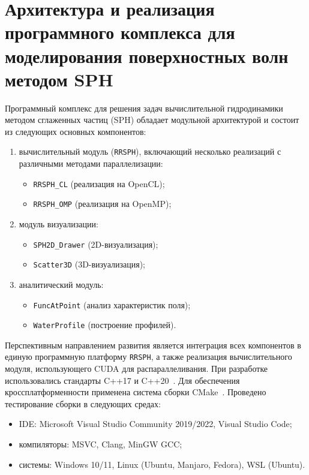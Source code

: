 \chapter{Архитектура и реализация программного комплекса для моделирования поверхностных волн методом SPH}

Программный комплекс для решения задач вычислительной гидродинамики методом сглаженных частиц (SPH) 
обладает модульной архитектурой и состоит из следующих основных компонентов:
%
\begin{enumerate}
    \item вычислительный модуль (\verb|RRSPH|), включающий несколько реализаций с различными методами параллелизации:
        \begin{itemize}
            \item \verb|RRSPH_CL| (реализация на OpenCL);
            \item \verb|RRSPH_OMP| (реализация на OpenMP);
        \end{itemize}
    \item модуль визуализации:
        \begin{itemize}
            \item \verb|SPH2D_Drawer| (2D-визуализация);
            \item \verb|Scatter3D| (3D-визуализация);
        \end{itemize}
    \item аналитический модуль:
         \begin{itemize}
            \item \verb|FuncAtPoint| (анализ характеристик поля);
            \item \verb|WaterProfile| (построение профилей).
        \end{itemize}
\end{enumerate}

Перспективным направлением развития является интеграция всех компонентов в единую программную платформу \verb|RRSPH|,
а также реализация вычислительного модуля, использующего CUDA для распараллеливания.
%
При разработке использовались стандарты C++17 и C++20~\cite{Gregoire2021, Savitch2016}. 
%
Для обеспечения кроссплатформенности применена система сборки CMake~\cite{Swidzinski2022}.
%
Проведено тестирование сборки в следующих средах:
\begin{itemize}
    \item IDE: Microsoft Visual Studio Community 2019/2022, Visual Studio Code;
    \item компиляторы: MSVC, Clang, MinGW GCC;
    \item системы: Windows 10/11, Linux (Ubuntu, Manjaro, Fedora), WSL (Ubuntu).
\end{itemize}

